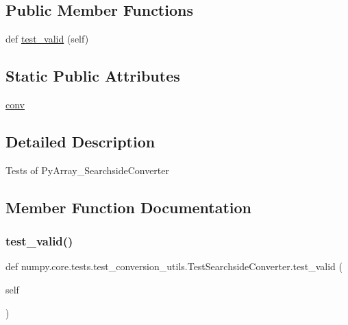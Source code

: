\subsection*{Public Member Functions}
\begin{DoxyCompactItemize}
\item 
def \hyperlink{classnumpy_1_1core_1_1tests_1_1test__conversion__utils_1_1TestSearchsideConverter_aef8d08750383f90caaf9ca8fda4c3496}{test\+\_\+valid} (self)
\end{DoxyCompactItemize}
\subsection*{Static Public Attributes}
\begin{DoxyCompactItemize}
\item 
\hyperlink{classnumpy_1_1core_1_1tests_1_1test__conversion__utils_1_1TestSearchsideConverter_acdf3ee7689d26b220d23e7a293453411}{conv}
\end{DoxyCompactItemize}


\subsection{Detailed Description}
\begin{DoxyVerb}Tests of PyArray_SearchsideConverter \end{DoxyVerb}
 

\subsection{Member Function Documentation}
\mbox{\label{classnumpy_1_1core_1_1tests_1_1test__conversion__utils_1_1TestSearchsideConverter_aef8d08750383f90caaf9ca8fda4c3496}} 
\subsubsection{\texorpdfstring{test\+\_\+valid()}{test\_valid()}}
{\footnotesize\ttfamily def numpy.\+core.\+tests.\+test\+\_\+conversion\+\_\+utils.\+Test\+Searchside\+Converter.\+test\+\_\+valid (\begin{DoxyParamCaption}\item[{}]{self }\end{DoxyParamCaption})}



